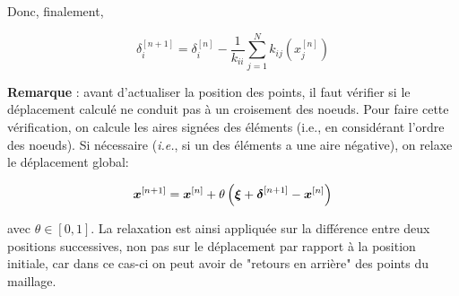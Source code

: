 \indent Donc, finalement,

\begin{equation*}
	\delta_i^{[n+1]} =  \delta_i^{[n]} -\frac{1}{k_{ii}} \sum_{j=1}^N k_{ij}(x_j^{[n]})
\end{equation*}

\indent \textbf{Remarque} : avant d'actualiser la position des points, il faut vérifier si le déplacement calculé ne conduit pas à un croisement des noeuds. Pour faire cette vérification, on calcule les aires signées des éléments (i.e., en considérant l'ordre des noeuds). Si nécessaire (\emph{i.e.}, si un des éléments a une aire négative), on relaxe le déplacement global: 


\begin{equation*}
	\boldsymbol{x}^{[n+1]} = \boldsymbol{x}^{[n]} + \theta \left( \boldsymbol{\xi} + \boldsymbol{\delta}^{[n+1]} - \boldsymbol{x}^{[n]} \right)
\end{equation*} 

\noindent avec \(\theta \in [0,1]\). La relaxation est ainsi appliquée sur la différence entre deux positions successives, non pas sur le déplacement par rapport à la position initiale, car dans ce cas-ci on peut avoir de "retours en arrière" des points du maillage.
